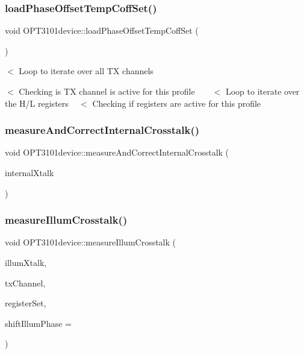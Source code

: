 \subsubsection{\texorpdfstring{load\+Phase\+Offset\+Temp\+Coff\+Set()}{loadPhaseOffsetTempCoffSet()}}
{\footnotesize\ttfamily void O\+P\+T3101device\+::load\+Phase\+Offset\+Temp\+Coff\+Set (\begin{DoxyParamCaption}\item[{void}]{ }\end{DoxyParamCaption})}

$<$ Loop to iterate over all TX channels

$<$ Checking is TX channel is active for this profile ~\newline
~\newline
 $<$ Loop to iterate over the H/L registers ~\newline
 $<$ Checking if registers are active for this profile \mbox{\label{class_o_p_t3101device_a041db5eb4a5a900ca5fff0c61ee8f7ab}} 
\subsubsection{\texorpdfstring{measure\+And\+Correct\+Internal\+Crosstalk()}{measureAndCorrectInternalCrosstalk()}}
{\footnotesize\ttfamily void O\+P\+T3101device\+::measure\+And\+Correct\+Internal\+Crosstalk (\begin{DoxyParamCaption}\item[{\mbox{\hyperlink{class_o_p_t3101_1_1crosstalk_c}{O\+P\+T3101\+::crosstalkC}} $\ast$}]{internal\+Xtalk }\end{DoxyParamCaption})}

\mbox{\label{class_o_p_t3101device_af0f08d859f6d8da0d894fa1d4ff5529b}} 
\subsubsection{\texorpdfstring{measure\+Illum\+Crosstalk()}{measureIllumCrosstalk()}}
{\footnotesize\ttfamily void O\+P\+T3101device\+::measure\+Illum\+Crosstalk (\begin{DoxyParamCaption}\item[{\mbox{\hyperlink{class_o_p_t3101_1_1crosstalk_c}{O\+P\+T3101\+::crosstalkC}} $\ast$}]{illum\+Xtalk,  }\item[{uint8\+\_\+t}]{tx\+Channel,  }\item[{char}]{register\+Set,  }\item[{uint8\+\_\+t}]{shift\+Illum\+Phase = {} }\end{DoxyParamCaption})}

